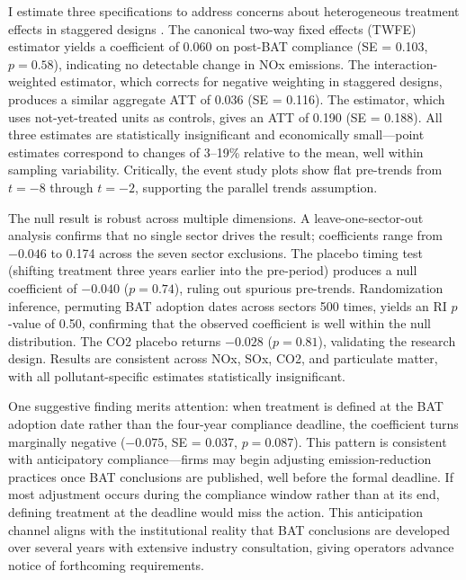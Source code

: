 \documentclass[12pt]{article}
\begin{document}
I estimate three specifications to address concerns about heterogeneous treatment effects in staggered designs \citep{goodmanbacon2021, roth2023}. The canonical two-way fixed effects (TWFE) estimator yields a coefficient of 0.060 on post-BAT compliance (SE = 0.103, $p = 0.58$), indicating no detectable change in NOx emissions. The \citet{sunabraham2021} interaction-weighted estimator, which corrects for negative weighting in staggered designs, produces a similar aggregate ATT of 0.036 (SE = 0.116). The \citet{callanaysantanna2021} estimator, which uses not-yet-treated units as controls, gives an ATT of 0.190 (SE = 0.188). All three estimates are statistically insignificant and economically small---point estimates correspond to changes of 3--19\% relative to the mean, well within sampling variability. Critically, the event study plots show flat pre-trends from $t = -8$ through $t = -2$, supporting the parallel trends assumption.

The null result is robust across multiple dimensions. A leave-one-sector-out analysis confirms that no single sector drives the result; coefficients range from $-0.046$ to 0.174 across the seven sector exclusions. The placebo timing test (shifting treatment three years earlier into the pre-period) produces a null coefficient of $-0.040$ ($p = 0.74$), ruling out spurious pre-trends. Randomization inference, permuting BAT adoption dates across sectors 500 times, yields an RI $p$-value of 0.50, confirming that the observed coefficient is well within the null distribution. The CO2 placebo returns $-0.028$ ($p = 0.81$), validating the research design. Results are consistent across NOx, SOx, CO2, and particulate matter, with all pollutant-specific estimates statistically insignificant.

One suggestive finding merits attention: when treatment is defined at the BAT adoption date rather than the four-year compliance deadline, the coefficient turns marginally negative ($-0.075$, SE = 0.037, $p = 0.087$). This pattern is consistent with anticipatory compliance---firms may begin adjusting emission-reduction practices once BAT conclusions are published, well before the formal deadline. If most adjustment occurs during the compliance window rather than at its end, defining treatment at the deadline would miss the action. This anticipation channel aligns with the institutional reality that BAT conclusions are developed over several years with extensive industry consultation, giving operators advance notice of forthcoming requirements.
\end{document}
